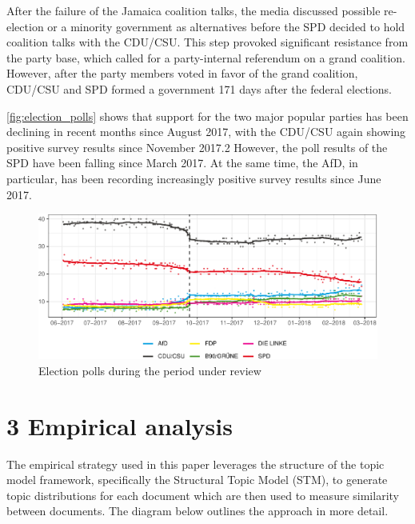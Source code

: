 \documentclass[
  12pt,
]{article}
\begin{document}
After the failure of the Jamaica coalition talks, the media discussed
possible re-election or a minority government as alternatives before the
SPD decided to hold coalition talks with the CDU/CSU. This step provoked
significant resistance from the party base, which called for a
party-internal referendum on a grand coalition. However, after the party
members voted in favor of the grand coalition, CDU/CSU and SPD formed a
government 171 days after the federal elections.

\autoref{fig:election_polls} shows that support for the two major
popular parties has been declining in recent months since August 2017,
with the CDU/CSU again showing positive survey results since November
2017.2 However, the poll results of the SPD have been falling since
March 2017. At the same time, the AfD, in particular, has been recording
increasingly positive survey results since June 2017.

\begin{figure}

{\centering \includegraphics[width=0.8\linewidth]{newspaper_files/figure-latex/election polls-1} 

}

\caption{Election polls during the period under review \label{fig:election_polls}}\label{fig:election polls}
\end{figure}

\pagebreak

\hypertarget{empirical-analysis}{%
\section{3 Empirical analysis}\label{empirical-analysis}}

The empirical strategy used in this paper leverages the structure of the
topic model framework, specifically the Structural Topic Model (STM), to
generate topic distributions for each document which are then used to
measure similarity between documents. The diagram below outlines the
approach in more detail.
\end{document}
